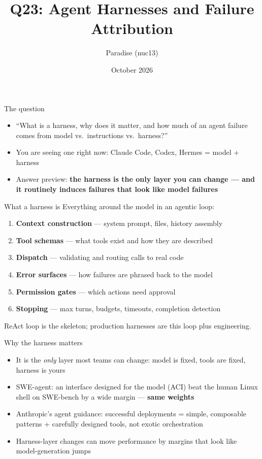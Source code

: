 \documentclass[aspectratio=169,11pt]{beamer}
\title{Q23: Agent Harnesses and Failure Attribution}
\author{Paradise (nuc13)}
\date{October 2026}
\begin{document}
\frame{\titlepage}

\begin{frame}{The question}
\begin{itemize}
\item ``What is a harness, why does it matter, and how much of an agent failure comes from model vs.\ instructions vs.\ harness?''
\item You are seeing one right now: Claude Code, Codex, Hermes = model + harness
\item Answer preview: \textbf{the harness is the only layer you can change --- and it routinely induces failures that look like model failures}
\end{itemize}
\end{frame}

\begin{frame}{What a harness is}
Everything around the model in an agentic loop:
\begin{enumerate}
\item \textbf{Context construction} --- system prompt, files, history assembly
\item \textbf{Tool schemas} --- what tools exist and how they are described
\item \textbf{Dispatch} --- validating and routing calls to real code
\item \textbf{Error surfaces} --- how failures are phrased back to the model
\item \textbf{Permission gates} --- which actions need approval
\item \textbf{Stopping} --- max turns, budgets, timeouts, completion detection
\end{enumerate}

\vspace{0.5em}
ReAct loop \cite{yao2023react} is the skeleton; production harnesses are this loop plus engineering.
\end{frame}

\begin{frame}{Why the harness matters}
\begin{itemize}
\item It is the \emph{only} layer most teams can change: model is fixed, tools are fixed, harness is yours
\item SWE-agent: an interface designed for the model (ACI) beat the human Linux shell on SWE-bench by a wide margin --- \textbf{same weights} \cite{yang2024sweagent}
\item Anthropic's agent guidance: successful deployments = simple, composable patterns + carefully designed tools, not exotic orchestration \cite{schluntz2024building}
\item Harness-layer changes can move performance by margins that look like model-generation jumps
\end{itemize}
\end{frame}
\end{document}
